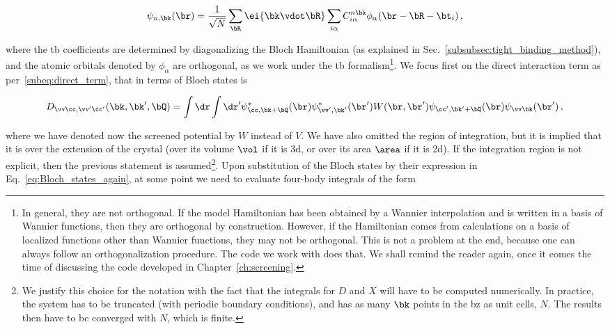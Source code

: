 \begin{equation}
    \psi_{n, \bk} (\br) = \frac{1}{\sqrt{N}} \sum_{\bR} \ei{\bk \vdot \bR} \sum_{i \alpha} C_{i \alpha}^{n \bk} \phi_{\alpha} (\br - \bR - \bt_i)\,,
\label{eq:Bloch_states_again}
\end{equation}

\noindent where the \gls{tb} coefficients are determined by diagonalizing the Bloch Hamiltonian (as explained in Sec.~\ref{subsubsec:tight_binding_method}), and the atomic orbitals denoted by $\phi_\alpha$ are orthogonal, as we work under the \gls{tb} formalism\footnote{In general, they are not orthogonal. If the model Hamiltonian has been obtained by a Wannier interpolation and is written in a basis of Wannier functions, then they are orthogonal by construction. However, if the Hamiltonian comes from calculations on a basis of localized functions other than Wannier functions, they may not be orthogonal. This is not a problem at the end, because one can always follow an orthogonalization procedure. The code we work with does that. We shall remind the reader again, once it comes the time of discussing the code developed in Chapter~\ref{ch:screening}.}.
We focus first on the direct interaction term as per~\eqref{subeq:direct_term}, that in terms of Bloch states is

\begin{equation}
    \label{eq:direct_term_real_space_formula}
    D_{\vv \cc , \vv ' \cc '}(\bk,\bk',\bQ) = \int \dr \int \dr' \psi^*_{\cc ,\bk+\bQ}(\br) \psi^*_{\vv ',\bk'}(\br') W(\br,\br') \psi_{\cc ',\bk'+\bQ}(\br) \psi_{\vv \bk}(\br')\,,
\end{equation}

\noindent where we have denoted now the screened potential by $W$ instead of $V$.
We have also omitted the region of integration, but it is implied that it is over the extension of the crystal (over its volume $\vol$ if it is \gls{3d}, or over its area $\area$ if it is \gls{2d}).
If the integration region is not explicit, then the previous statement is assumed\footnote{We justify this choice for the notation with the fact that the integrals for $D$ and $X$ will have to be computed numerically. In practice, the system has to be truncated (with periodic boundary conditions), and has as many $\bk$ points in the \gls{bz} as unit cells, $N$. The results then have to be converged with $N$, which is finite.}.
Upon substitution of the Bloch states by their expression in Eq.~\eqref{eq:Bloch_states_again}, at some point we need to evaluate four-body integrals of the form

